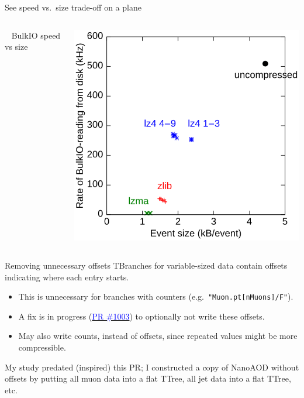 \documentclass[aspectratio=169]{beamer}
\begin{document}
\begin{frame}{See speed vs.\ size trade-off on a plane}
\begin{columns}
\vspace{2 cm}

\mbox{ } \hfill BulkIO speed vs size \hfill \mbox{ }

\includegraphics[width=\linewidth]{bulk.png}
\end{columns}
\end{frame}

\begin{frame}{Removing unnecessary offsets}
\vspace{0.5 cm}
TBranches for variable-sized data contain offsets indicating where each entry starts.
\begin{itemize}
\item This is unnecessary for branches with counters (e.g.\ {\tt "Muon.pt[nMuons]/F"}).
\item A fix is in progress (\href{https://github.com/root-project/root/pull/1003}{\textcolor{blue}{PR \#1003}}) to optionally not write these offsets.
\item May also write counts, instead of offsets, since repeated values might be more compressible.
\end{itemize}

\vspace{0.5 cm}
\begin{center}
\begin{minipage}{0.7\linewidth}
My study predated (inspired) this PR; I constructed a copy of NanoAOD without offsets by putting all muon data into a flat TTree, all jet data into a flat TTree, etc.
\end{minipage}
\end{center}
\end{frame}
\end{document}
